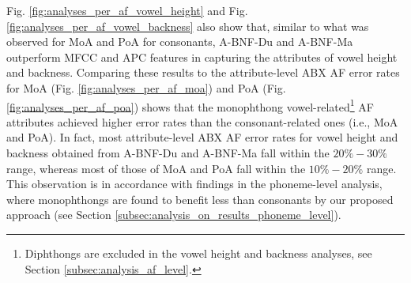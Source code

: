 \documentclass[transmag]{IEEEtran}
\begin{document}
Fig. \ref{fig:analyses_per_af_vowel_height} and Fig. \ref{fig:analyses_per_af_vowel_backness} also show that,  
similar to what was observed for MoA and PoA for consonants, A-BNF-Du and A-BNF-Ma outperform MFCC and APC features in capturing the attributes of vowel height and backness. Comparing these results to the attribute-level ABX AF error rates for MoA (Fig. \ref{fig:analyses_per_af_moa}) and PoA (Fig. \ref{fig:analyses_per_af_poa}) shows that the monophthong vowel-related\footnote{Diphthongs are excluded in the vowel height and backness analyses, see Section \ref{subsec:analysis_af_level}.} AF attributes achieved higher error rates than the consonant-related ones  (i.e., MoA and PoA). In fact, most attribute-level ABX AF error rates for vowel height and backness obtained from A-BNF-Du and A-BNF-Ma fall within the $20\%-30\%$ range, whereas most of those of MoA and  PoA  fall  within the $10\%-20\%$ range.  This  observation  is  in accordance with findings in the phoneme-level analysis, where monophthongs are found to benefit less than consonants by our proposed approach (see Section \ref{subsec:analysis_on_results_phoneme_level}).

\end{document}
